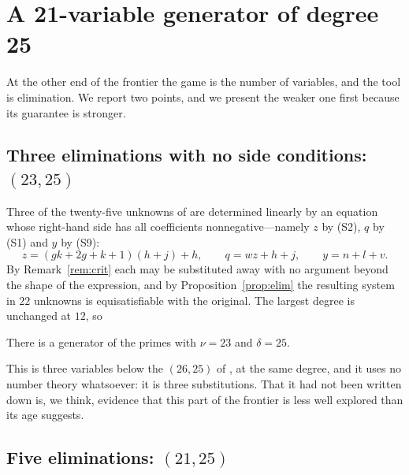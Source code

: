 \section{A 21-variable generator of degree 25}
\label{sec:var21}

At the other end of the frontier the game is the number of variables, and the
tool is elimination. We report two points, and we present the weaker one first
because its guarantee is stronger.

\subsection{Three eliminations with no side conditions: \texorpdfstring{$(23,25)$}{(23,25)}}

Three of the twenty-five unknowns of \cite{jsww1976} are determined linearly by
an equation whose right-hand side has all coefficients nonnegative---namely $z$
by \textup{(S2)}, $q$ by \textup{(S1)} and $y$ by \textup{(S9)}:
\[
  z = (gk+2g+k+1)(h+j)+h, \qquad
  q = wz+h+j, \qquad
  y = n+l+v .
\]
By Remark~\ref{rem:crit} each may be substituted away with no argument beyond
the shape of the expression, and by Proposition~\ref{prop:elim} the resulting
system in $22$ unknowns is equisatisfiable with the original. The largest degree
is unchanged at $12$, so

\begin{theorem}
\label{thm:23}
There is a generator of the primes with $\nu=23$ and $\delta=25$.
\end{theorem}

This is three variables below the $(26,25)$ of \cite{jsww1976}, at the same
degree, and it uses no number theory whatsoever: it is three substitutions. That
it had not been written down is, we think, evidence that this part of the
frontier is less well explored than its age suggests.

\subsection{Five eliminations: \texorpdfstring{$(21,25)$}{(21,25)}}
\label{ssec:21}

